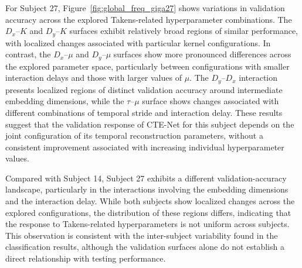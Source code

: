 For Subject 27, Figure~\ref{fig:global_freq_giga27} shows variations in validation accuracy across the explored Takens-related hyperparameter combinations. The $D_x$--$K$ and $D_y$--$K$ surfaces exhibit relatively broad regions of similar performance, with localized changes associated with particular kernel configurations. In contrast, the $D_x$--$\mu$ and $D_y$--$\mu$ surfaces show more pronounced differences across the explored parameter space, particularly between configurations with smaller interaction delays and those with larger values of $\mu$. The $D_y$--$D_x$ interaction presents localized regions of distinct validation accuracy around intermediate embedding dimensions, while the $\tau$--$\mu$ surface shows changes associated with different combinations of temporal stride and interaction delay. These results suggest that the validation response of CTE-Net for this subject depends on the joint configuration of its temporal reconstruction parameters, without a consistent improvement associated with increasing individual hyperparameter values.

Compared with Subject 14, Subject 27 exhibits a different validation-accuracy landscape, particularly in the interactions involving the embedding dimensions and the interaction delay. While both subjects show localized changes across the explored configurations, the distribution of these regions differs, indicating that the response to Takens-related hyperparameters is not uniform across subjects. This observation is consistent with the inter-subject variability found in the classification results, although the validation surfaces alone do not establish a direct relationship with testing performance.
    
